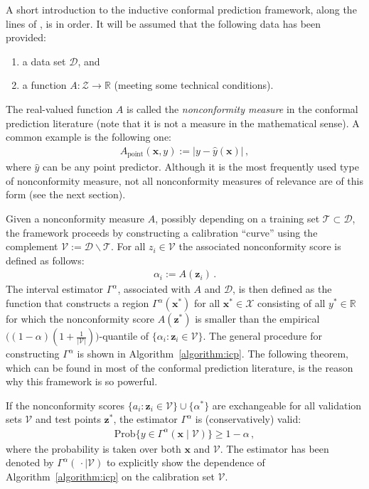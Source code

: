 \documentclass[smallcondensed]{svjour3}
\begin{document}
    A short introduction to the inductive conformal prediction framework, along the lines of \cite{cp_all}, is in order. It will be assumed that the following data has been provided:
    \begin{enumerate}[1)]
        \item a data set $\mathcal{D}$, and
        \item a function $A:\mathcal{Z}\rightarrow\mathbb{R}$ (meeting some technical conditions).
    \end{enumerate}
    The real-valued function $A$ is called the \textit{nonconformity measure} in the conformal prediction literature (note that it is not a measure in the mathematical sense). A common example is the following one:
    \begin{gather}
        \label{dist}
        A_\text{point}(\mathbf{x},y) := |y - \hat{y}(\mathbf{x})|\,,
    \end{gather}
    where $\hat{y}$ can be any point predictor. Although it is the most frequently used type of nonconformity measure, not all nonconformity measures of relevance are of this form (see the next section).

    Given a nonconformity measure $A$, possibly depending on a training set $\mathcal{T}\subset\mathcal{D}$, the framework proceeds by constructing a calibration ``curve'' using the complement $\mathcal{V}:=\mathcal{D}\backslash\mathcal{T}$. For all $z_i\in\mathcal{V}$ the associated nonconformity score is defined as follows:
    \begin{gather}
        \label{score}
        \alpha_i := A(\mathbf{z}_i)\,.
    \end{gather}
    The interval estimator $\Gamma^\alpha$, associated with $A$ and $\mathcal{D}$, is then defined as the function that constructs a region $\Gamma^\alpha(\mathbf{x}^*)$ for all $\mathbf{x}^*\in\mathcal{X}$ consisting of all $y^*\in\mathbb{R}$ for which the nonconformity score $A(\mathbf{z}^*)$ is smaller than the empirical $\big((1-\alpha)(1 + \frac{1}{|\mathcal{V}|})\big)$-quantile of $\{\alpha_i:\mathbf{z}_i\in\mathcal{V}\}$. The general procedure for constructing $\Gamma^\alpha$ is shown in Algorithm~\ref{algorithm:icp}. The following theorem, which can be found in most of the conformal prediction literature, is the reason why this framework is so powerful.

    \begin{theorem*}
        If the nonconformity scores $\{a_i:\mathbf{z}_i\in\mathcal{V}\}\cup\{\alpha^*\}$ are exchangeable for all validation sets $\mathcal{V}$ and test points $\mathbf{z}^*$, the estimator $\Gamma^\alpha$ is (conservatively) valid:
        \begin{gather}
            \mathrm{Prob}\big\{y\in\Gamma^\alpha(\mathbf{x}\mid\mathcal{V})\big\}\geq1-\alpha\,,
        \end{gather}
        where the probability is taken over both $\mathbf{x}$ and $\mathcal{V}$. The estimator has been denoted by $\Gamma^\alpha(\,\cdot\mid\mathcal{V})$ to explicitly show the dependence of Algorithm~\ref{algorithm:icp} on the calibration set $\mathcal{V}$.
    \end{theorem*}
\end{document}
